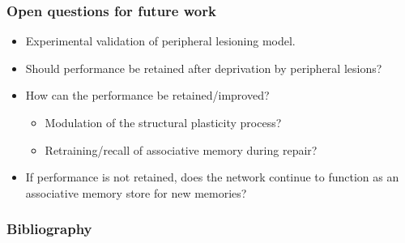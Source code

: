 \begin{frame}[c]
  \frametitle{Open questions for future work}
  \begin{itemize}
    \item Experimental validation of peripheral lesioning model\footnotemark[4]{}.
    \pause{}
    \item Should performance be retained after deprivation by peripheral lesions?
      \pause{}
    \item How can the performance be retained/improved?
      \begin{itemize}
        \item Modulation of the structural plasticity process?
        \item Retraining/recall of associative memory during repair?
      \end{itemize}
      \pause{}
    \item If performance is not retained, does the network continue to function as an associative memory store for new memories?
  \end{itemize}
\end{frame}
\begin{frame}[t,allowframebreaks]
  \frametitle{Bibliography}
  \printbibliography[heading=none]{}
\end{frame}


